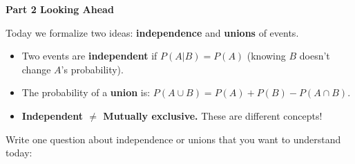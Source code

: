 \documentclass[10pt]{article}
\begin{document}
\vspace{0.28in}

{\large\bfseries\color{navy} Part 2 \quad Looking Ahead}

\vspace{0.12in}

\noindent Today we formalize two ideas: \textbf{independence} and \textbf{unions} of events.

\vspace{0.14in}

\begin{tcolorbox}[colback=greenbg, colframe=greenacc, boxrule=0.8pt, arc=2mm,
    left=4mm, right=4mm, top=3mm, bottom=3mm]
    \small
    \begin{itemize}[leftmargin=1.3em, itemsep=8pt]
      \item Two events are \textbf{independent} if $P(A|B) = P(A)$ (knowing $B$ doesn't change $A$'s probability).
      \item The probability of a \textbf{union} is: $P(A \cup B) = P(A) + P(B) - P(A \cap B)$.
      \item \textbf{Independent $\neq$ Mutually exclusive.} These are different concepts!
    \end{itemize}
\end{tcolorbox}

\vspace{0.2in}

\noindent\textcolor{slate}{\small Write one question about independence or unions that you
want to understand today:}\\[8pt]
\writeline\\[2pt]\writeline
\end{document}
